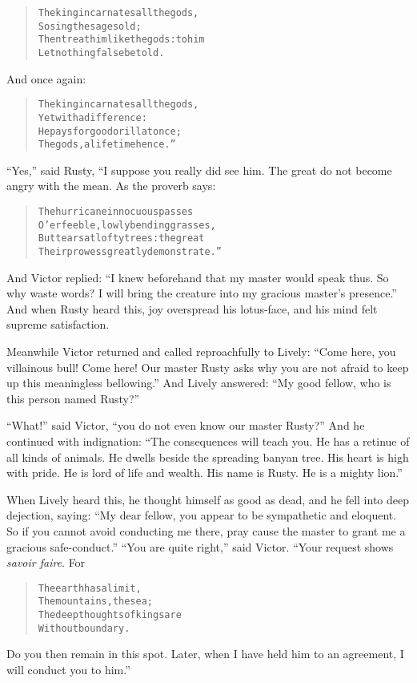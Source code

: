 \documentclass[article, twoside, 14pt]{memoir}
\renewenvironment{verbatim}{%
\begin{quote}%
\vskip -10pt%
\begin{alltt}\normalfont\large}{\end{alltt}%
\end{quote}%
\vskip -10pt
} %
\begin{document}
\begin{verbatim}
The king incarnates all the gods,
    So sing the sages old;
Then treat him like the gods: to him
    Let nothing false be told.
\end{verbatim}
And once again:

\begin{verbatim}
The king incarnates all the gods,
    Yet with a difference:
He pays for good or ill at once;
    The gods, a lifetime hence.”
\end{verbatim}
``Yes,'' said Rusty, “I suppose you really did see him. The great
do not become angry with the mean. As the proverb says:

\begin{verbatim}
The hurricane innocuous passes
O'er feeble, lowly bending grasses,
But tears at lofty trees: the great
Their prowess greatly demonstrate.”
\end{verbatim}
And Victor replied:
``I knew beforehand that my master would speak thus. So why waste words? I will bring the creature into my gracious master's presence.''
And when Rusty heard this, joy overspread his lotus-face, and his
mind felt supreme satisfaction.

Meanwhile Victor returned and called reproachfully to Lively:
``Come here, you villainous bull! Come here! Our master Rusty asks why you are not afraid to keep up this meaningless bellowing.''
And Lively answered:
``My good fellow, who is this person named Rusty?''

``What!'' said Victor, ``you do not even know our master Rusty?''
And he continued with indignation:
``The consequences will teach you. He has a retinue of all kinds of animals. He dwells beside the spreading banyan tree. His heart is high with pride. He is lord of life and wealth. His name is Rusty. He is a mighty lion.''

When Lively heard this, he thought himself as good as dead, and he
fell into deep dejection, saying:
``My dear fellow, you appear to be sympathetic and eloquent. So if you cannot avoid conducting me there, pray cause the master to grant me a gracious safe-conduct.''
``You are quite right,'' said Victor. “Your request shows
\emph{savoir faire}. For

\begin{verbatim}
The earth has a limit,
    The mountains, the sea;
The deep thoughts of kings are
    Without boundary.
\end{verbatim}
Do you then remain in this spot. Later, when I have held him to an
agreement, I will conduct you to him.”
\end{document}

